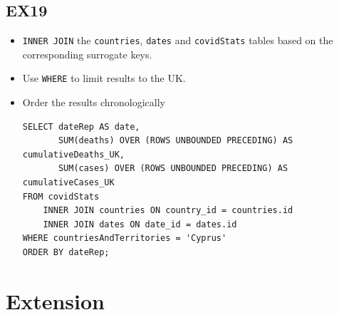 \documentclass[12pt,oneside,a4paper,english]{article}
\begin{document}
\subsection{EX19}
\begin{itemize}
\item \texttt{INNER JOIN} the \texttt{countries}, \texttt{dates} and \texttt{covidStats} tables based on the corresponding surrogate keys.
\item Use \texttt{WHERE} to limit results to the UK.
\item Order the results chronologically 

\begin{lstlisting}
SELECT dateRep AS date,
       SUM(deaths) OVER (ROWS UNBOUNDED PRECEDING) AS cumulativeDeaths_UK,
       SUM(cases) OVER (ROWS UNBOUNDED PRECEDING) AS cumulativeCases_UK
FROM covidStats
    INNER JOIN countries ON country_id = countries.id
    INNER JOIN dates ON date_id = dates.id
WHERE countriesAndTerritories = 'Cyprus'
ORDER BY dateRep;
\end{lstlisting}
\end{itemize}


\newpage
\section{Extension}
\end{document}
